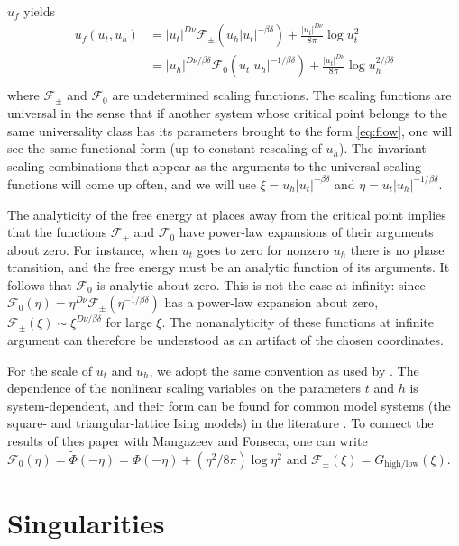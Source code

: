 \documentclass[
  aps,
  pre,
  preprint,
  longbibliography,
  floatfix
]{revtex4-2}
\begin{document}
$u_f$ yields
\begin{equation}
  \begin{aligned}
    u_f(u_t, u_h)
    &=|u_t|^{D\nu}\mathcal F_\pm(u_h|u_t|^{-\beta\delta})+\frac{|u_t|^{D\nu}}{8\pi}\log u_t^2 \\
    &=|u_h|^{D\nu/\beta\delta}\mathcal F_0(u_t|u_h|^{-1/\beta\delta})+\frac{|u_t|^{D\nu}}{8\pi}\log u_h^{2/\beta\delta} \\
  \end{aligned}
\end{equation}
where $\mathcal F_\pm$ and $\mathcal F_0$ are undetermined scaling functions.
The scaling functions are universal in the sense that if another system whose
critical point belongs to the same universality class has its parameters
brought to the form \eqref{eq:flow}, one will see the same functional form (up
to constant rescaling of $u_h$). The invariant scaling combinations that appear
as the arguments to the universal scaling functions will come up often, and we
will use $\xi=u_h|u_t|^{-\beta\delta}$ and $\eta=u_t|u_h|^{-1/\beta\delta}$.

The analyticity of the free energy at places away from the critical point implies that the functions
$\mathcal F_\pm$ and $\mathcal F_0$ have power-law expansions of their
arguments about zero. For instance, when $u_t$ goes to zero for nonzero $u_h$
there is no phase transition, and the free energy must be an analytic function
of its arguments. It follows that $\mathcal F_0$ is analytic about zero. This
is not the case at infinity: since $\mathcal F_0(\eta)=\eta^{D\nu}\mathcal
F_\pm(\eta^{-1/\beta\delta})$ has a power-law expansion about zero, $\mathcal
F_\pm(\xi)\sim \xi^{D\nu/\beta\delta}$ for large $\xi$. The nonanalyticity of
these functions at infinite argument can therefore be understood as an artifact
of the chosen coordinates.

For the scale of $u_t$ and $u_h$, we adopt the same convention as used by
\cite{Fonseca_2003_Ising}. The dependence of the nonlinear scaling variables on
the parameters $t$ and $h$ is system-dependent, and their form can be found for
common model systems (the square- and triangular-lattice Ising models) in the
literature \cite{Mangazeev_2010_Scaling, Clement_2019_Respect}.  To connect the
results of thes paper with Mangazeev and Fonseca, one can write $\mathcal
F_0(\eta)=\tilde\Phi(-\eta)=\Phi(-\eta)+(\eta^2/8\pi) \log \eta^2$ and
$\mathcal F_\pm(\xi)=G_{\mathrm{high}/\mathrm{low}}(\xi)$.

\section{Singularities}
\end{document}
